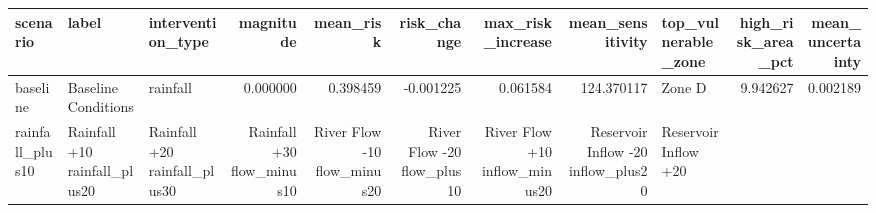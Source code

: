 \begin{tabular}{lllrrrrrlrr}
\toprule
scenario & label & intervention_type & magnitude & mean_risk & risk_change & max_risk_increase & mean_sensitivity & top_vulnerable_zone & high_risk_area_pct & mean_uncertainty \\
\midrule
baseline & Baseline Conditions & rainfall & 0.000000 & 0.398459 & -0.001225 & 0.061584 & 124.370117 & Zone D & 9.942627 & 0.002189 \\
rainfall_plus10 & Rainfall +10%
rainfall_plus20 & Rainfall +20%
rainfall_plus30 & Rainfall +30%
flow_minus10 & River Flow -10%
flow_minus20 & River Flow -20%
flow_plus10 & River Flow +10%
inflow_minus20 & Reservoir Inflow -20%
inflow_plus20 & Reservoir Inflow +20%
\bottomrule
\end{tabular}
